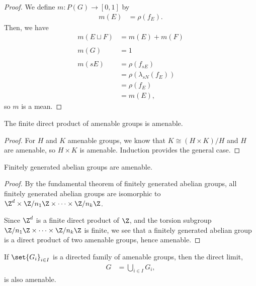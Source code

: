 \begin{proof}
  We define $m\colon P(G)\rightarrow [0,1]$ by
  \begin{align*}
    m(E) &= \rho\left(f_E\right).
  \end{align*}
  Then, we have
  \begin{align*}
    m\left(E\sqcup F\right) &= m(E) + m(F)\\
                            \\
    m\left(G\right) &= 1\\
    \\
    m\left(sE\right) &= \rho\left(f_{sE}\right)\\
                     &= \rho\left(\lambda_{sN}\left(f_{E}\right)\right)\\
                     &= \rho\left(f_E\right)\\
                     &= m(E),
  \end{align*}
  so $m$ is a mean.
\end{proof}
\begin{corollary}
  The finite direct product of amenable groups is amenable.
\end{corollary}
\begin{proof}
  For $H$ and $K$ amenable groups, we know that $K\cong \left(H\times K\right)/H$ and $H$ are amenable, so $H\times K$ is amenable. Induction provides the general case.
\end{proof}
\begin{corollary}
  Finitely generated abelian groups are amenable.
\end{corollary}
\begin{proof}
  By the fundamental theorem of finitely generated abelian groups, all finitely generated abelian groups are isomorphic to $\Z^{d}\times \Z/n_1\Z\times\cdots\times \Z/{n_k}\Z$.\newline

  Since $\Z^{d}$ is a finite direct product of $\Z$, and the torsion subgroup $\Z/n_1\Z\times\cdots\times \Z/n_k\Z$ is finite, we see that a finitely generated abelian group is a direct product of two amenable groups, hence amenable.
\end{proof}
\begin{corollary}
  If $\set{G_i}_{i\in I}$ is a directed family of amenable groups, then the direct limit,
  \begin{align*}
    G &= \bigcup_{i\in I}G_i,
  \end{align*}
  is also amenable.
\end{corollary}
